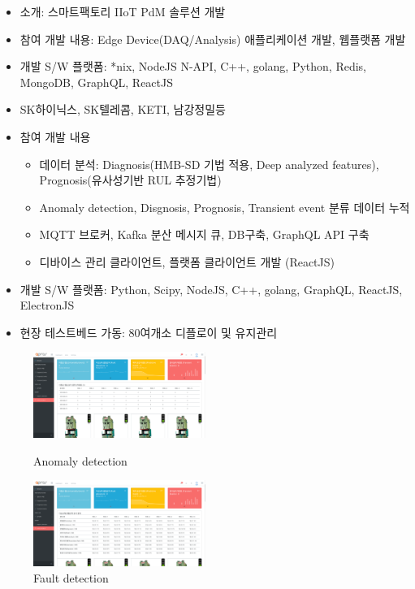 \documentclass[10pt,a4paper,ragged2e]{altacv}
\begin{document}
\begin{fullwidth}
	\begin{itemize}
		\item 소개: 스마트팩토리 IIoT PdM 솔루션 개발
		\item 참여 개발 내용: Edge Device(DAQ/Analysis) 애플리케이션 개발, 웹플랫폼 개발
		\item 개발 S/W 플랫폼: *nix, NodeJS N-API, C++, golang, Python, Redis, MongoDB, GraphQL, ReactJS
		\item SK하이닉스, SK텔레콤, KETI, 남강정밀등
		\item 참여 개발 내용
		      \begin{itemize}
			      \item 데이터 분석: Diagnosis(HMB-SD 기법 적용, Deep analyzed features), Prognosis(유사성기반 RUL 추정기법)
			      \item Anomaly detection, Disgnosis, Prognosis, Transient event 분류 데이터 누적
			      \item MQTT 브로커, Kafka 분산 메시지 큐, DB구축, GraphQL API 구축
			      \item 디바이스 관리 클라이언트, 플랫폼 클라이언트 개발 (ReactJS)
		      \end{itemize}
		\item 개발 S/W 플랫폼: Python, Scipy, NodeJS, C++, golang, GraphQL, ReactJS, ElectronJS
		\item 현장 테스트베드 가동: 80여개소 디플로이 및 유지관리
	\end{itemize}
	\begin{figure}[!ht]
		\begin{fullwidth}
			\parbox{0.5\textwidth}{
				\centering
				\includegraphics[width=0.5\textwidth]{images/new_dashboard_02.png}
				\caption*{Anomaly detection}
			}\qquad
			\parbox{0.5\textwidth}{
				\centering
				\includegraphics[width=0.5\textwidth]{images/new_dashboard_03.png}
				\caption*{Fault detection}
}
\end{fullwidth}
\end{figure}
\end{fullwidth}
\end{document}
